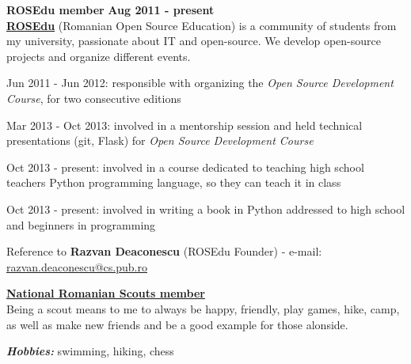 \documentclass[margin,line]{resume}
\begin{document}
\begin{resume}
    \vspace{1.2mm}\textbf{ROSEdu member} \hfill \textbf{Aug 2011 - present} \vspace{1.5mm}\\
	\href{http://rosedu.org/}{\textbf{ROSEdu}} (Romanian Open Source Education) is a community of 
	students from my university, passionate about IT and open-source. We develop 
	open-source projects and organize different events.\vspace{1mm}
	\begin{list2}
        \item Jun 2011 - Jun 2012: responsible with organizing the \textit{Open Source Development Course}, for two consecutive editions
        \item Mar 2013 - Oct 2013: involved in a mentorship session and held technical presentations (git, Flask) for \textit{Open Source Development Course}
        \item Oct 2013 - present: involved in a course dedicated to teaching high school teachers Python programming language, so they can teach it in class
        \item Oct 2013 - present: involved in writing a book in Python addressed to high school and beginners in programming
	\end{list2}\vspace{-3mm}
	\small{Reference to \textbf{Razvan Deaconescu} (ROSEdu Founder)
		- e-mail: \href{mailto:razvan.deaconescu@cs.pub.ro}{razvan.deaconescu@cs.pub.ro}}

	\href{http://www.scoutpanaitescu.ro/}{\textbf{National Romanian Scouts member}}\vspace{1mm}\\
	Being a scout means to me to always be happy, friendly, play games, hike, camp, as well as make new friends and be a good example for those alonside.

	\textbf{\textit{Hobbies:}} swimming, hiking, chess



\end{resume}
\end{document}

